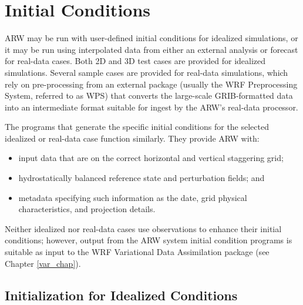 \chapter{Initial Conditions}
\label{initialization_chap}

ARW may be run with user-defined initial conditions 
for idealized simulations, or it may be run using
interpolated data from either an external analysis or forecast for
real-data cases.  Both 2D and 3D test cases are provided for idealized
simulations.  
Several sample cases are provided for real-data simulations, which
rely on pre-processing from an external package (usually the 
WRF Preprocessing System, referred to as WPS) that converts
the large-scale GRIB-formatted data into an intermediate format suitable for ingest by the ARW's
real-data processor.

The programs that generate the specific initial conditions for the selected 
idealized or real-data case function similarly. They provide ARW with:
\begin{itemize}\setlength{\parskip}{-5pt}
\item input data that are on the correct horizontal and vertical staggering grid;
\item hydrostatically balanced reference state and perturbation fields; and
\item metadata specifying such information as the date, grid physical characteristics,
and projection details.
\end{itemize}
\noindent Neither idealized nor real-data cases use
observations to enhance their initial conditions; however, output from 
the ARW system initial condition programs is suitable as input to the WRF Variational
Data Assimilation package (see Chapter \ref{var_chap}).

\section{Initialization for Idealized Conditions}

